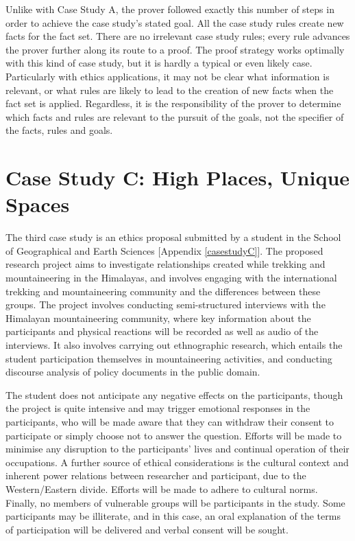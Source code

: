 \documentclass{l4proj}
\begin{document}
Unlike with Case Study A, the prover followed exactly this number of steps in order to achieve the case study's stated goal. All the case study rules create new facts for the fact set. There are no irrelevant case study rules; every rule advances the prover further along its route to a proof. The proof strategy works optimally with this kind of case study, but it is hardly a typical or even likely case. Particularly with ethics applications, it may not be clear what information is relevant, or what rules are likely to lead to the creation of new facts when the fact set is applied. Regardless, it is the responsibility of the prover to determine which facts and rules are relevant to the pursuit of the goals, not the specifier of the facts, rules and goals. 

\section{Case Study C: High Places, Unique Spaces}
The third case study is an ethics proposal submitted by a student in the School of Geographical and Earth Sciences [Appendix \ref{casestudyC}]. The proposed research project aims to investigate relationships created while trekking and mountaineering in the Himalayas, and involves engaging with the international trekking and mountaineering community and the differences between these groups. The project involves conducting semi-structured interviews with the Himalayan mountaineering community, where key information about the participants and physical reactions will be recorded as well as audio of the interviews. It also involves carrying out ethnographic research, which entails the student participation themselves in mountaineering activities, and conducting discourse analysis of policy documents in the public domain. 

The student does not anticipate any negative effects on the participants, though the project is quite intensive and may trigger emotional responses in the participants, who will be made aware that they can withdraw their consent to participate or simply choose not to answer the question. Efforts will be made to minimise any disruption to the participants' lives and continual operation of their occupations. A further source of ethical considerations is the cultural context and inherent power relations between researcher and participant, due to the Western/Eastern divide. Efforts will be made to adhere to cultural norms. Finally, no members of vulnerable groups will be participants in the study. Some participants may be illiterate, and in this case, an oral explanation of the terms of participation will be delivered and verbal consent will be sought. 
\end{document}
